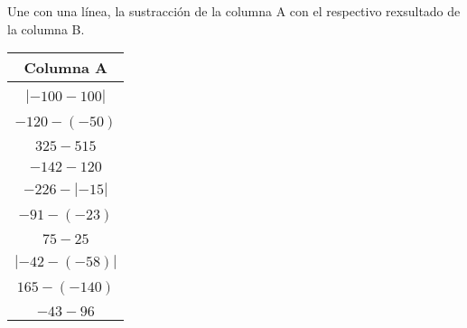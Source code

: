 \documentclass[spanish,letterpaper, 11pt, addpoints, answers]{exam}
\begin{document}
\begin{questions}
\begin{minipage}{0.4\linewidth}
\begin{tcolorbox}[colback=white]
\begin{center}
\begin{tabular}{c}
    \end{tabular}
  \end{center}
\end{tcolorbox}
\end{minipage}

\question Une con una línea, la sustracción de la columna A con el respectivo rexsultado de la columna B.

\begin{minipage}{0.4\linewidth}
  \begin{tcolorbox}[colback=white]
  \begin{center}
    \begin{tabular}{c}
      \textbf{Columna A} \\ \hline \\
      $|-100-100|$\\\\
      $-120-(-50)$\\\\
      $325-515$\\\\
      $-142-120$\\\\
      $-226-|-15|$\\\\
      $-91-(-23)$\\\\
      $75-25$\\\\
      $|-42-(-58)|$\\\\
      $165-(-140)$\\\\
      $-43-96$
      

\end{tabular}
\end{center}
\end{tcolorbox}
\end{minipage}
\end{questions}
\end{document}
